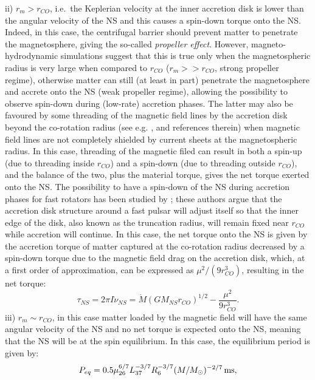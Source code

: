 \documentclass[graybox]{svmult}
\begin{document}
ii) $r_m > r_{CO}$, i.e.\ the Keplerian velocity at the inner accretion disk is lower than the angular velocity of the NS and this causes a spin-down torque onto the NS. Indeed, in this case, the centrifugal barrier should prevent matter to penetrate the magnetosphere, giving the so-called {\it propeller effect}. However, magneto-hydrodynamic simulations \cite{Romanova2005} suggest that this is true only when the magnetospheric radius is very large when compared to $r_{CO}$ ($r_m >> r_{CO}$, strong propeller regime), otherwise matter can still (at least in part) penetrate the magnetosphere and accrete onto the NS (weak propeller regime), allowing the possibility to observe spin-down during (low-rate) accretion phases. The latter may also be favoured by some threading of the magnetic field lines by the accretion disk beyond the co-rotation radius (see e.g. \cite{Wang87, Rappaport2004, Kluzniak2007}, and references therein) when magnetic field lines are not completely shielded by current sheets at the magnetospheric radius. In this case, threading of the magnetic filed can result in both a spin-up (due to threading inside $r_{CO}$) and a spin-down (due to threading outside $r_{CO}$), and the balance of the two, plus the material torque, gives the net torque exerted onto the NS. The possibility to have a spin-down of the NS during accretion phases for fast rotators has been studied by \cite{Rappaport2004, Kluzniak2007}; these authors argue that the accretion disk structure around a fast pulsar will adjust itself so that the inner edge of the disk, also known as the truncation radius, will remain fixed near $r_{CO}$ while accretion will continue. In this case, the net torque onto the NS is given by the accretion torque of matter captured at the co-rotation radius decreased by a spin-down torque due to the magnetic field drag on the accretion disk, which, at a first order of approximation, can be expressed as $\mu^2 / (9 r_{CO}^3)$, resulting in the net torque:
\begin{equation}
\label{torque}
\tau_{NS}= 2\pi I \dot{\nu}_{NS} = \dot M (G M_{NS} r_{CO})^{1/2} - \frac{\mu^2}{9 r_{CO}^3}.
\end{equation}
iii) $r_m \sim r_{CO}$, in this case matter loaded by the magnetic field will have the same angular velocity of the NS and no net torque is expected onto the NS, meaning that the NS will be at the spin equilibrium. In this case, the equilibrium period is given by:
\begin{equation}
\label{Peq}
P_{eq} = 0.5 \mu_{26}^{6/7} L_{37}^{-3/7} R_6^{-3/7} (M/M_\odot)^{-2/7}\, \rm ms,
\end{equation}
\end{document}
